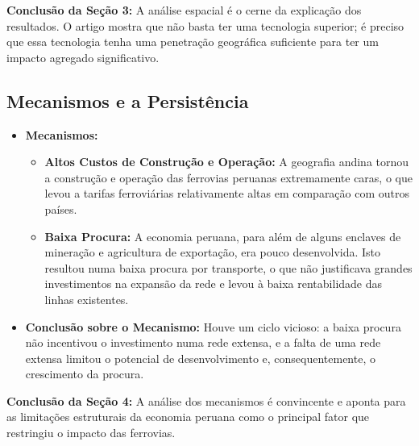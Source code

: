\documentclass[12pt, a4paper]{article}
\begin{document}
\noindent\textbf{Conclusão da Seção 3:} A análise espacial é o cerne da explicação dos resultados. O artigo mostra que não basta ter uma tecnologia superior; é preciso que essa tecnologia tenha uma penetração geográfica suficiente para ter um impacto agregado significativo.

\subsection{Mecanismos e a Persistência}

\begin{itemize}
    \item \textbf{Mecanismos:}
        \begin{itemize}
            \item \textbf{Altos Custos de Construção e Operação:} A geografia andina tornou a construção e operação das ferrovias peruanas extremamente caras, o que levou a tarifas ferroviárias relativamente altas em comparação com outros países.
            \item \textbf{Baixa Procura:} A economia peruana, para além de alguns enclaves de mineração e agricultura de exportação, era pouco desenvolvida. Isto resultou numa baixa procura por transporte, o que não justificava grandes investimentos na expansão da rede e levou à baixa rentabilidade das linhas existentes.
        \end{itemize}
    \item \textbf{Conclusão sobre o Mecanismo:} Houve um ciclo vicioso: a baixa procura não incentivou o investimento numa rede extensa, e a falta de uma rede extensa limitou o potencial de desenvolvimento e, consequentemente, o crescimento da procura.
\end{itemize}

\noindent\textbf{Conclusão da Seção 4:} A análise dos mecanismos é convincente e aponta para as limitações estruturais da economia peruana como o principal fator que restringiu o impacto das ferrovias.
\end{document}
